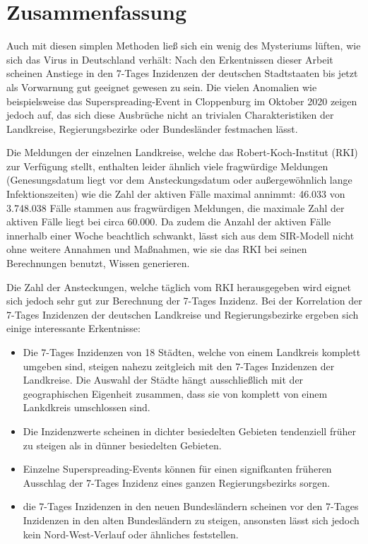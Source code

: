 \chapter{Zusammenfassung}\label{chap:Zusammenfassun}
Auch mit diesen simplen Methoden ließ sich ein wenig des Mysteriums lüften, wie sich das Virus in Deutschland verhält: Nach den Erkentnissen dieser Arbeit scheinen Anstiege in den 7-Tages Inzidenzen der deutschen Stadtstaaten bis jetzt als Vorwarnung gut geeignet gewesen zu sein. Die vielen Anomalien wie beispielsweise das Superspreading-Event in Cloppenburg im Oktober 2020 zeigen jedoch auf, das sich diese Ausbrüche nicht an trivialen Charakteristiken der Landkreise, Regierungsbezirke oder Bundesländer festmachen lässt.

Die Meldungen der einzelnen Landkreise, welche das Robert-Koch-Institut (RKI) zur Verfügung stellt, enthalten leider ähnlich viele fragwürdige Meldungen (Genesungsdatum liegt vor dem Ansteckungsdatum oder außergewöhnlich lange Infektionszeiten) wie die Zahl der aktiven Fälle maximal annimmt: 46.033 von 3.748.038 Fälle stammen aus fragwürdigen Meldungen, die maximale Zahl der aktiven Fälle liegt bei circa 60.000. Da zudem die Anzahl der aktiven Fälle innerhalb einer Woche beachtlich schwankt, lässt sich aus dem SIR-Modell nicht ohne weitere Annahmen und Maßnahmen, wie sie das RKI bei seinen Berechnungen benutzt, Wissen generieren.

Die Zahl der Ansteckungen, welche täglich vom RKI herausgegeben wird eignet sich jedoch sehr gut zur Berechnung der 7-Tages Inzidenz.
Bei der Korrelation der 7-Tages Inzidenzen der deutschen Landkreise und Regierungsbezirke ergeben sich einige interessante Erkentnisse:
\begin{itemize}
    \item Die 7-Tages Inzidenzen von 18 Städten, welche von einem Landkreis komplett umgeben sind, steigen nahezu zeitgleich mit den 7-Tages Inzidenzen der Landkreise. Die Auswahl der Städte hängt ausschließlich mit der geographischen Eigenheit zusammen, dass sie von komplett von einem Lankdkreis umschlossen sind.
    \item Die Inzidenzwerte scheinen in dichter besiedelten Gebieten tendenziell früher zu steigen als in dünner besiedelten Gebieten.
    \item Einzelne Superspreading-Events können für einen signifkanten früheren Ausschlag der 7-Tages Inzidenz eines ganzen Regierungsbezirks sorgen.
    \item die 7-Tages Inzidenzen in den neuen Bundesländern scheinen vor den 7-Tages Inzidenzen in den alten Bundesländern zu steigen, ansonsten lässt sich jedoch kein Nord-West-Verlauf oder ähnliches feststellen.
\end{itemize}